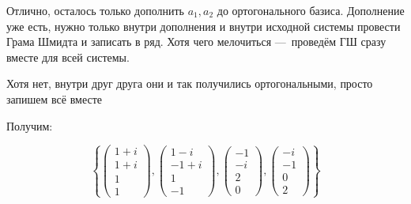 \documentclass[12pt, a4paper]{article}
\begin{document}
    Отлично, осталось только дополнить $a_1, a_2$ до ортогонального базиса. Дополнение уже есть, 
    нужно только внутри дополнения и внутри исходной системы провести Грама Шмидта и записать в ряд. 
    Хотя чего мелочиться — проведём ГШ сразу вместе для всей системы.

    Хотя нет, внутри друг друга они и так получились ортогональными, просто запишем всё вместе

    Получим:

    \begin{equation}
        \left\{
            \begin{pmatrix}
                1+i \\ 1+i \\ 1 \\ 1
            \end{pmatrix},
            \begin{pmatrix}
                1-i\\-1+i\\1\\-1
            \end{pmatrix},
            \begin{pmatrix}
                -1 \\ -i \\ 2 \\ 0
            \end{pmatrix},
            \begin{pmatrix}
                -i \\ -1 \\ 0 \\ 2
            \end{pmatrix}
         \right\}
    \end{equation}
\end{document}
